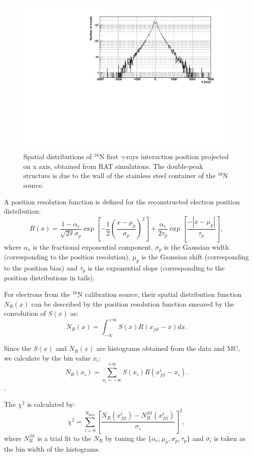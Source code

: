 \begin{figure}[!htb]
	\centering
	\includegraphics[width=12cm]{sx.pdf}
	\caption{Spatial distributions of {$^{16}$}N first $\gamma$-rays interaction position projected on x axis, obtained from RAT simulations. The double-peak structure is due to the wall of the stainless steel container of the $^{16}$N source.}
	\label{hsx}
\end{figure}

A position resolution function is defined for the reconstructed electron position distribution\cite{boulay2004direct}:
\[
R(x)=\frac{1-\alpha_e}{\sqrt{2\pi}\sigma_p}\exp{[-\frac{1}{2}(\frac{x-\mu_p}{\sigma_p})^2]+\frac{\alpha_e}{2\tau_p}\exp{[\frac{-|x-\mu_p|}{\tau_p}]}},
\]
where $\alpha_e$ is the fractional exponential component, $\sigma_p$ is
the Gaussian width (corresponding to the position resolution), $\mu_p$ is the Gaussian shift  (corresponding to the position bias) and $\tau_p$ is the exponential slope (corresponding to the position distributions in tails).

For electrons from the $^{16}$N calibration source, their spatial distribution function $N_{R}(x)$ can be described by the position resolution function smeared by the convolution of $S(x)$ as\cite{boulay2004direct}:
\[
N_{R}(x)=\int^{+\infty}_{-\infty} S(x)R(x_{fit}-x)dx.
\]

Since the $S(x)$ and $N_{R}(x)$ are histograms obtained from the data and MC, we calculate by the bin value $x_i$: 
\[N_R(x_i)=\sum_{x_i=-\infty}^{+\infty}S(x_i)R(x_{fit}^i-x_i).\].

The $\chi^2$ is calculated by:
\[
\chi^2=\sum^{N_{bins}}_{i=0}[\frac{N_R(x_{fit}^i)-N_R^{fit}(x_{fit}^i)}{\sigma_i}]^2,
\]
where $N_R^{fit}$ is a trial fit to the $N_R$ by tuning the $\{\alpha_e,\mu_p,\sigma_p,\tau_p\}$ and $\sigma_i$ is taken as the bin width of the histograms.


